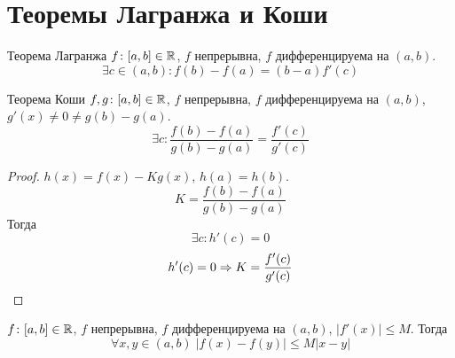 ﻿\section{Теоремы Лагранжа и Коши}
\begin{theorem}{Теорема Лагранжа}
$f\colon [a, b] \in \mathbb{R}$, $f$ непрерывна, $f$ дифференцируема на $(a, b)$.
$$\exists c \in (a, b)\colon f(b) - f(a) = (b-a) f'(c)$$
\end{theorem}
\begin{theorem}{Теорема Коши}
$f, g\colon [a, b] \in \mathbb{R}$, $f$ непрерывна, $f$ дифференцируема на $(a, b)$, $g'(x) \ne 0 \ne g(b) - g(a)$.
$$\exists c\colon \frac{f(b) - f(a)}{g(b) - g(a)} = \frac{f'(c)}{g'(c)}$$
\end{theorem}
\begin{proof}
$h(x) = f(x) - Kg(x)$, $h(a) = h(b)$.
$$K = \frac{f(b) - f(a)}{g(b) - g(a)}$$
Тогда
$$\exists c\colon h'(c) = 0$$
$$h'(c) = 0 \Rightarrow K = \frac{f'(c)}{g'(c)}$$
\end{proof}

\begin{conseq}
$f\colon [a, b] \in \mathbb{R}$, $f$ непрерывна, $f$ дифференцируема на $(a, b)$, $|f'(x)| \leqslant M$.
Тогда
$$\forall x,y\in(a,b)\; |f(x) - f(y)| \leqslant M|x-y|$$
\end{conseq}